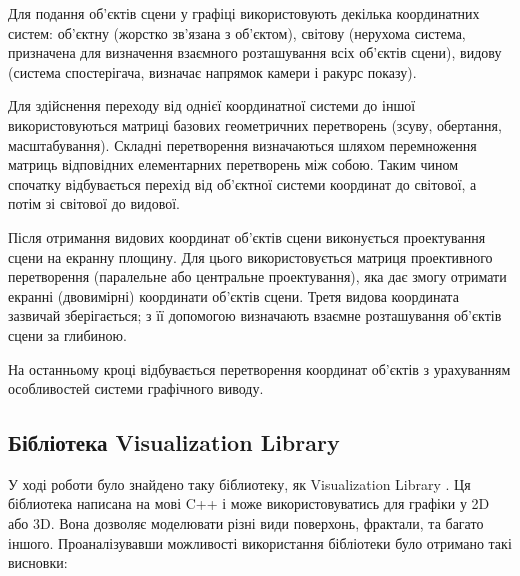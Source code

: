 \let\mypdfximage\pdfximage\def\pdfximage{\immediate\mypdfximage}\documentclass[14pt,a4paper]{extarticle}
\theoremstyle{definition}
\renewcommand{\[}{\begin{singlespace}\begin{equation*}}
\renewcommand{\]}{\end{equation*}\end{singlespace}}
\renewcommand{\+}{\discretionary{\mbox{\scriptsize$\hookleftarrow$}}{}{}}
\begin{document}
Для подання об'єктів сцени у графіці використовують декілька координатних систем: об'єктну (жорстко зв'язана з об'єктом), світову (нерухома система, призначена для визначення взаємного розташування всіх об'єктів сцени), видову (система спостерігача, визначає напрямок камери і ракурс показу).

Для здійснення переходу від однієї координатної системи до іншої використовуються матриці базових геометричних перетворень (зсуву, обертання, масштабування). Складні перетворення визначаються шляхом перемноження матриць відповідних елементарних перетворень між собою. Таким чином спочатку відбувається перехід від об'єктної системи координат до світової, а потім зі світової до видової.

Після отримання видових координат об'єктів сцени виконується проектування сцени на екранну площину. Для цього використовується матриця проективного перетворення (паралельне або центральне проектування), яка дає змогу отримати екранні (двовимірні) координати об'єктів сцени. Третя видова координата зазвичай зберігається; з її допомогою визначають взаємне розташування об'єктів сцени за глибиною.

На останньому кроці відбувається перетворення координат об’єктів з урахуванням особливостей системи графічного виводу.

\subsection{Бібліотека Visualization Library}

У ході роботи було знайдено таку біблиотеку, як Visualization Library \cite{visualizationlibrary}. Ця біблиотека написана на мові C++ і може використовуватись для графіки у 2D або 3D. Вона дозволяє моделювати різні види поверхонь, фрактали, та багато іншого. Проаналізувавши можливості використання бібліотеки було отримано такі висновки:
\end{document}
